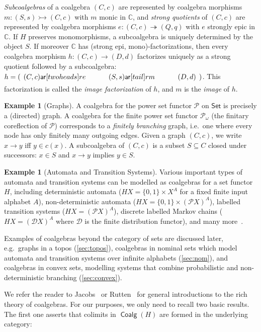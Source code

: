 \documentclass[10pt,a4paper]{article}
\theoremstyle{definition}
\newtheorem{example}[theorem]{Example}
\theoremstyle{remark}
\numberwithin{equation}{section}
\providecommand{\catname}{\mathsf}
\def\Set{\catname{Set}}
\newcommand{\Pow}{\mathcal{P}}
\newcommand{\Powf}{\mathcal{P}_{\omega}}
\newcommand{\ar}{\mathsf{ar}}
\newcommand{\epito}{\twoheadrightarrow}
\newcommand{\seq}{\subseteq}
\providecommand{\C}{}
\renewcommand{\C}{{\mathbb{C}}}
\DeclareMathOperator{\Coalg}{\mathsf{Coalg}}
\newcommand{\monoto}{\rightarrowtail}
\theoremstyle{plain}
\theoremstyle{definition}
\begin{document}
\emph{Subcoalgebras} of a coalgebra $(C,c)$ are represented by coalgebra morphisms  $m\colon (S,s)\monoto (C,c)$ with $m$ monic in $\C$, and \emph{strong quotients} of $(C,c)$ are represented by coalgebra morphisms $e\colon (C,c)\epito (Q,q)$ with $e$ strongly epic in $\C$. If $H$ preserves monomorphisms, a subcoalgebra is uniquely determined by the object $S$. If moreover $\C$ has (strong epi, mono)-factorizations, then every coalgebra morphism $h\colon (C,c)\to (D,d)$ factorizes uniquely as a strong quotient followed by a subcoalgebra: $h = (\begin{tikzcd} (C,c) \ar[two heads]{r}{e} & (S,s) \ar[tail]{r}{m} & (D,d) \end{tikzcd})$. This factorization is called the \emph{image factorization} of $h$, and $m$ is the \emph{image} of $h$.

\begin{example}[Graphs]\label{ex:coalgebras}
 A coalgebra for the power set functor $\Pow$ on $\Set$ is precisely a (directed) graph. A coalgebra for the finite power set functor $\Powf$ (the finitary coreflection of $\Pow$) corresponds to a \emph{finitely branching} graph, i.e.\ one where every node has only finitely many outgoing edges. Given a graph $(C,c)$, we write $x\to y$ iff $y\in c(x)$. 
A subcoalgebra of $(C,c)$ is a subset $S\seq C$ closed under successors: $x\in S$ and $x\to y$ implies $y\in S$.
\end{example}

\begin{example}[Automata and Transition Systems]
Various important types of automata and transition systems can be modelled as coalgebras for a set functor $H$, including deterministic automata ($HX=\{0,1\}\times X^A$ for a fixed finite input alphabet $A$), non-deterministic automata ($HX=\{0,1\}\times (\Pow X)^A$), labelled transition systems ($HX = (\Pow X)^A$), discrete labelled Markov chains ($HX=(\mathcal{D}X)^A$ where $\mathcal{D}$ is the finite distribution functor), and many more~\cite{jacobs16,rutten00}.
\end{example}

Examples of coalgebras beyond the category of sets are discussed later, e.g.\ graphs in a topos (\autoref{sec:topos}), coalgebras in nominal sets which model automata and transition systems over
  infinite alphabets (\autoref{sec:nom}), and 
  coalgebras in convex sets, modelling systems that combine probabilistic and non-deterministic branching
  (\autoref{sec:convex}).

We refer the reader to Jacobs~\cite{jacobs16} or Rutten~\cite{rutten00} for general introductions to the rich theory of coalgebras. For our purposes, we only need to recall two basic results. The first one asserts that colimits in $\Coalg(H)$ are formed in the underlying category:
\end{document}
